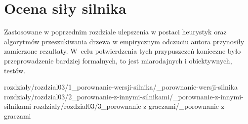 
\chapter {Ocena siły silnika}
\label {ch: ocena-sily-silnika}

Zastosowane w poprzednim rozdziale ulepszenia w postaci heurystyk oraz algorytmów przeszukiwania drzewa w empirycznym odczuciu autora przynosiły zamierzone rezultaty.
W~celu potwierdzenia tych przypuszczeń konieczne było przeprowadzenie bardziej formalnych, to jest miarodajnych i obiektywnych, testów.

 {rozdzialy/rozdzial03/1_porownanie-wersji-silnika/_porownanie-wersji-silnika}
 {rozdzialy/rozdzial03/2_porownanie-z-innymi-silnikami/_porownanie-z-innymi-silnikami}
 {rozdzialy/rozdzial03/3_porownanie-z-graczami/_porownanie-z-graczami}


